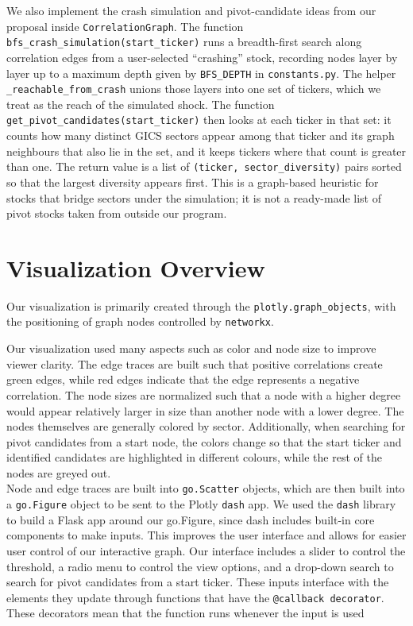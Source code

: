 \documentclass[fontsize=11pt]{article}
\begin{document}
We also implement the crash simulation and pivot-candidate ideas from our proposal inside \texttt{CorrelationGraph}. The function \texttt{bfs\_crash\_simulation(start\_ticker)} runs a breadth-first search along correlation edges from a user-selected ``crashing'' stock, recording nodes layer by layer up to a maximum depth given by \texttt{BFS\_DEPTH} in \texttt{constants.py}. The helper \texttt{\_reachable\_from\_crash} unions those layers into one set of tickers, which we treat as the reach of the simulated shock. The function \texttt{get\_pivot\_candidates(start\_ticker)} then looks at each ticker in that set: it counts how many distinct GICS sectors appear among that ticker and its graph neighbours that also lie in the set, and it keeps tickers where that count is greater than one. The return value is a list of \texttt{(ticker, sector\_diversity)} pairs sorted so that the largest diversity appears first. This is a graph-based heuristic for stocks that bridge sectors under the simulation; it is not a ready-made list of pivot stocks taken from outside our program.


\section*{Visualization Overview}
Our visualization is primarily created through the \texttt{plotly.graph\_objects}, with the positioning of graph nodes controlled by \texttt{networkx}.


Our visualization used many aspects such as color and node size to improve viewer clarity. The edge traces are built such that positive correlations create green edges, while red edges indicate that the edge represents a negative correlation. The node sizes are normalized such that a node with a higher degree would appear relatively larger in size than another node with a lower degree. The nodes themselves are generally colored by sector. Additionally, when searching for pivot candidates from a start node, the colors change so that the start ticker and identified candidates are highlighted in different colours, while the rest of the nodes are greyed out.\\

Node and edge traces are built into \texttt{go.Scatter} objects, which are then built into a \texttt{go.Figure} object to be sent to the Plotly \texttt{dash} app. We used the \texttt{dash} library to build a Flask app around our go.Figure, since dash includes built-in core components to make inputs. This improves the user interface and allows for easier user control of our interactive graph. Our interface includes a slider to control the threshold, a radio menu to control the view options, and a drop-down search to search for pivot candidates from a start ticker. These inputs interface with the elements they update through functions that have the \texttt{@callback decorator}. These decorators mean that the function runs whenever the input is used\\
\end{document}
